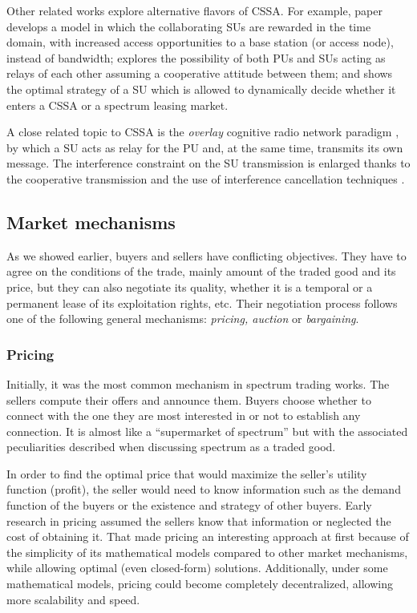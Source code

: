 Other related works explore alternative flavors of CSSA. For example, paper \cite{ref:Canzian2013} develops a model in which the collaborating SUs are rewarded in the time domain, with increased access opportunities to a base station (or access node), instead of bandwidth; \cite{ref:Tran2014} explores the possibility of both PUs and SUs acting as relays of each other assuming a cooperative attitude between them; and \cite{ref:Shao2014} shows the optimal strategy of a SU which is allowed to dynamically decide whether it enters a CSSA or a spectrum leasing market. 

A close related topic to CSSA is the \textit{overlay} cognitive radio network paradigm \cite{ref:Goldsmith2009}, by which a SU acts as relay for the PU and, at the same time, transmits its own message. The interference constraint on the SU transmission is enlarged thanks to the cooperative transmission and the use of interference cancellation techniques \cite{ref:Han2010}. 

\subsection{Market mechanisms}
\label{subsec:Market}
As we showed earlier, buyers and sellers have conflicting objectives. They have to agree on the conditions of the trade, mainly amount of the traded good and its price, but they can also negotiate its quality, whether it is a temporal or a permanent lease of its exploitation rights, etc. Their negotiation process follows one of the following general mechanisms: \textit{pricing, auction} or \textit{bargaining}. 
	
\subsubsection{Pricing}
Initially, it was the most common mechanism in spectrum trading works. The sellers compute their offers and announce them. Buyers choose whether to connect with the one they are most interested in or not to establish any connection. It is almost like a ``supermarket of spectrum'' but with the associated peculiarities described when discussing spectrum as a traded good. 

In order to find the optimal price that would maximize the seller's utility function (profit), the seller would need to know information such as the demand function of the buyers or the existence and strategy of other buyers. Early research in pricing assumed the sellers know that information or neglected the cost of obtaining it. That made pricing an interesting approach at first because of 
the simplicity of its mathematical models compared to other market mechanisms, while allowing optimal (even closed-form) solutions. Additionally, under some mathematical models, pricing could become completely decentralized, allowing more scalability and speed.

